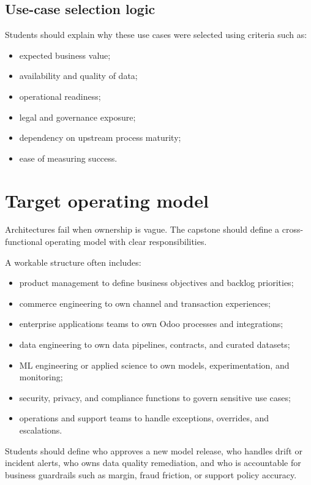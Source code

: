 \subsection{Use-case selection logic}
Students should explain why these use cases were selected using criteria such as:
\begin{itemize}
  \item expected business value;
  \item availability and quality of data;
  \item operational readiness;
  \item legal and governance exposure;
  \item dependency on upstream process maturity;
  \item ease of measuring success.
\end{itemize}

\section{Target operating model}
Architectures fail when ownership is vague. The capstone should define a cross-functional operating model with clear responsibilities.

A workable structure often includes:
\begin{itemize}
  \item product management to define business objectives and backlog priorities;
  \item commerce engineering to own channel and transaction experiences;
  \item enterprise applications teams to own Odoo processes and integrations;
  \item data engineering to own data pipelines, contracts, and curated datasets;
  \item ML engineering or applied science to own models, experimentation, and monitoring;
  \item security, privacy, and compliance functions to govern sensitive use cases;
  \item operations and support teams to handle exceptions, overrides, and escalations.
\end{itemize}

Students should define who approves a new model release, who handles drift or incident alerts, who owns data quality remediation, and who is accountable for business guardrails such as margin, fraud friction, or support policy accuracy.

